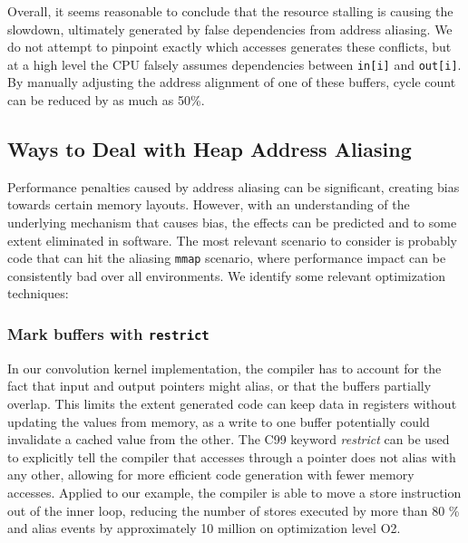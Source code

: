 \documentclass[10pt, conference, compsocconf]{IEEEtran}
\begin{document}
Overall, it seems reasonable to conclude that the resource stalling is causing the slowdown, ultimately generated by false dependencies from address aliasing.
We do not attempt to pinpoint exactly which accesses generates these conflicts, but at a high level the CPU falsely assumes dependencies between \texttt{in[i]} and \texttt{out[i]}.
By manually adjusting the address alignment of one of these buffers, cycle count can be reduced by as much as 50\%.


\subsection{Ways to Deal with Heap Address Aliasing}
Performance penalties caused by address aliasing can be significant, creating bias towards certain memory layouts.
However, with an understanding of the underlying mechanism that causes bias, the effects can be predicted and to some extent eliminated in software.
The most relevant scenario to consider is probably code that can hit the aliasing \texttt{mmap} scenario, where performance impact can be consistently bad over all environments.
We identify some relevant optimization techniques:

\subsubsection{Mark buffers with \texttt{restrict}}
In our convolution kernel implementation, the compiler has to account for the fact that input and output pointers might alias, or that the buffers partially overlap.
This limits the extent generated code can keep data in registers without updating the values from memory, as a write to one buffer potentially could invalidate a cached value from the other.
The C99 keyword \emph{restrict} can be used to explicitly tell the compiler that accesses through a pointer does not alias with any other, allowing for more efficient code generation with fewer memory accesses.
Applied to our example, the compiler is able to move a store instruction out of the inner loop, reducing the number of stores executed by more than 80 \% and alias events by approximately 10 million on optimization level O2.
\end{document}
